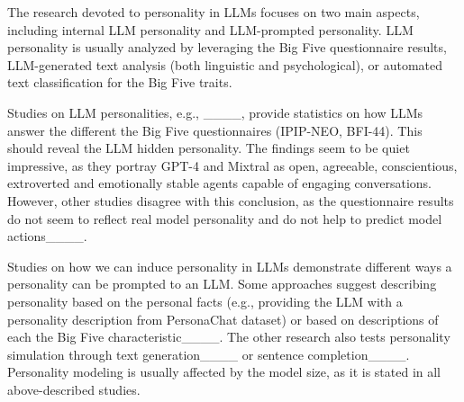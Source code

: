 The research devoted to personality in LLMs focuses on two main aspects, including internal LLM personality and LLM-prompted personality. LLM personality is usually analyzed by leveraging the Big Five questionnaire results, LLM-generated text analysis (both linguistic and psychological), or automated text classification for the Big Five traits.

Studies on LLM personalities, e.g., ____, provide statistics on how LLMs answer the different the Big Five questionnaires (IPIP-NEO, BFI-44). This should reveal the LLM hidden personality. The findings seem to be quiet impressive, as they portray GPT-4 and Mixtral as open, agreeable, conscientious, extroverted and emotionally stable agents capable of engaging conversations. However, other studies disagree with this conclusion, as the questionnaire results do not seem to reflect real model personality and do not help to predict model actions____.

Studies on how we can induce personality in LLMs demonstrate different ways a personality can be prompted to an LLM. Some approaches suggest describing personality based on the personal facts (e.g., providing the LLM with a personality description from PersonaChat dataset) or based on descriptions of each the Big Five characteristic____. The other research also tests personality simulation through text generation____ or sentence completion____. Personality modeling is usually affected by the model size, as it is stated in all above-described studies. 
% 
